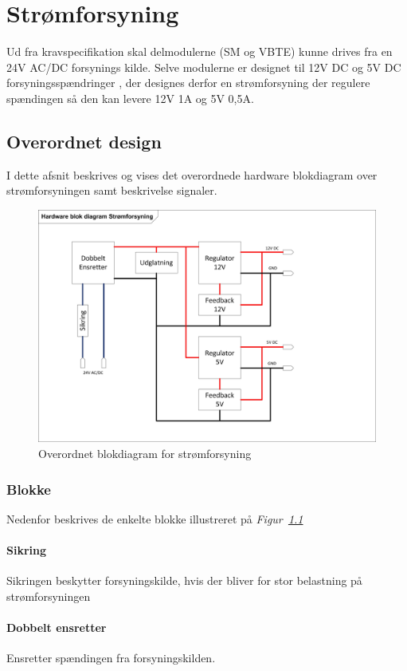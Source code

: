 \chapter{Strømforsyning}
Ud fra kravspecifikation skal delmodulerne (SM og VBTE) kunne drives fra en 24V AC/DC forsynings kilde. Selve modulerne er designet til 12V DC og 5V DC forsyningsspændringer , der designes derfor en strømforsyning der regulere spændingen så den kan levere 12V 1A og 5V 0,5A.  

\section{Overordnet design}
I dette afsnit beskrives og vises det overordnede hardware blokdiagram over strømforsyningen samt beskrivelse signaler.

\begin{figure}[H]
\centering
\includegraphics[width=1\textwidth]{billeder/PowerSupplyBlok}
\caption{Overordnet blokdiagram for strømforsyning}
\label{fig:PowerSubbly Blok}
\end{figure}
\subsection{Blokke}
Nedenfor beskrives de enkelte blokke illustreret på \textit{Figur~\ref{fig:PowerSubbly Blok}}
\subsubsection{Sikring}
Sikringen beskytter forsyningskilde, hvis der bliver for stor belastning på strømforsyningen
\subsubsection{Dobbelt ensretter}
Ensretter spændingen fra forsyningskilden. 
